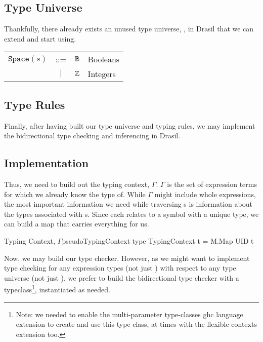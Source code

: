 \subsection{Type Universe}
\label{chap:typed-expr:sec:typing-the-expression-language:subsec:type-universe}

Thankfully, there already exists an unused type universe, \Space{}, in Drasil
that we can extend and start using.

\begin{longtable}{ r c c l}
      \(\texttt{Space}(s)\) & ::=       & \(\mathbb{B}\) & Booleans \\
                            & \(\vert\) & \(\mathbb{Z}\) & Integers
\end{longtable}

\subsection{Type Rules}
\label{chap:typed-expr:sec:typing-the-expression-language:subsec:type-rules}


Finally, after having built our type universe and typing rules, we may implement
the bidirectional type checking and inferencing in Drasil.

\subsection{Implementation}
\label{chap:typed-expr:sec:typing-the-expression-language:subsec:implementation}

Thus, we need to build out the typing context, \(\Gamma\). \(\Gamma\) is the set
of expression terms for which we already know the type of. While \(\Gamma\)
might include whole expressions, the most important information we need while
traversing \Expr{}s is information about the types associated with \UID{}s.
Since each \UID{} relates to a symbol with a unique type, we can build a map
that carries everything for us.

\begin{pseudohaskell}{Typing Context, \(\Gamma\)}{pseudoTypingContext}
type TypingContext t = M.Map UID t
\end{pseudohaskell}

Now, we may build our type checker. However, as we might want to implement type
checking for any expression types (not just \Expr{}) with respect to any type
universe (not just \Space{}), we prefer to build the bidirectional type checker
with a typeclass\footnote{Note: we needed to enable the multi-parameter
type-classes \acs{ghc} language extension to create and use this type class, at
times with the flexible contexts extension too.}, instantiated as needed.

